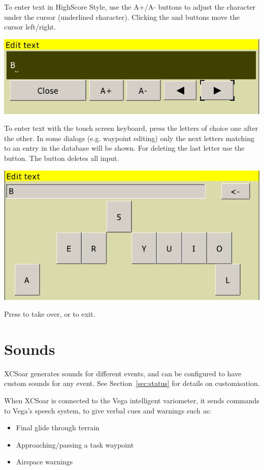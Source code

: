 \documentclass[a4paper,12pt]{refrep}
\begin{document}
To enter text in HighScore Style, use the A+/A- buttons to adjust the character under the
cursor (underlined character). Clicking the \button{$<$} and \button{$>$} buttons move the
cursor left/right.  

\begin{center}
\includegraphics[angle=0,width=0.6\linewidth,keepaspectratio='true']{figures/textentry.png}
\end{center}

To enter text with the touch screen keyboard, press the letters of choice one after the other. 
In some dialogs (e.g. waypoint editing) only the next letters matching to an entry in the database 
will be shown. For deleting the last letter use the \button{$<-$} button. The
 button deletes all input.

\begin{center}
\includegraphics[angle=0,width=0.6\linewidth,keepaspectratio='true']{figures/textentry_keyboard.png}
\end{center}

Press  to take over, or  to exit.

\section{Sounds}

XCSoar generates sounds for different events, and can be configured to
have custom sounds for any event.  See Section~\ref{sec:status} for
details on customisation.

When XCSoar is connected to the Vega intelligent variometer, it sends
commands to Vega's speech system, to give verbal cues and warnings such as:
\begin{itemize}
\item Final glide through terrain
\item Approaching/passing a task waypoint
\item Airspace warnings
\end{itemize}
\end{document}
